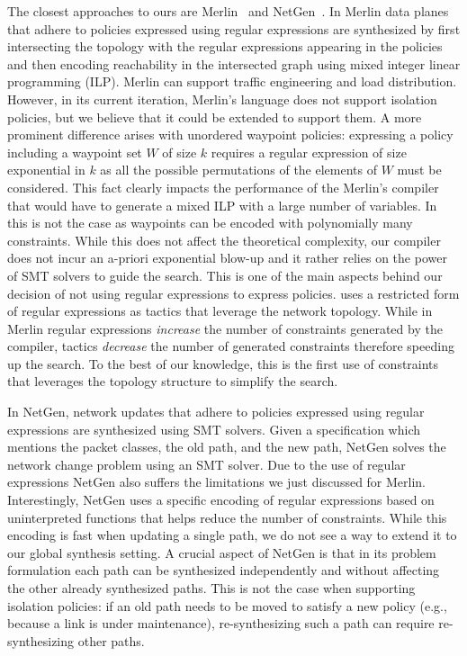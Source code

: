 The closest approaches to ours are Merlin~\cite{merlin} and
NetGen~\cite{netgen}.  In Merlin data planes that adhere to policies
expressed using regular expressions are synthesized by first
intersecting the topology with the regular expressions appearing in
the policies and then encoding reachability in the intersected graph
using mixed integer linear programming (ILP).
Merlin can support traffic engineering and load distribution. 
However, in its current iteration, 
Merlin's language does not support isolation policies, but we believe
that it could be extended to support them.  
A more prominent
difference arises with unordered waypoint policies: expressing a
policy including a waypoint set $W$ of size $k$ requires a regular
expression of size exponential in $k$ as all the possible permutations
of the elements of $W$ must be considered. This fact clearly impacts the performance of
the Merlin's compiler that would have to generate a mixed ILP with a
large number of variables.  In \Name this is not the case as waypoints
can be encoded with polynomially many constraints.  While this does
not affect the theoretical complexity, our compiler does not incur
an a-priori exponential blow-up and it rather relies on the power
of SMT solvers to guide the search.  This is one of the main aspects
behind our decision of not using regular expressions to express
policies.  \Name uses a restricted form of regular expressions as 
tactics that leverage the network topology.  While in Merlin
regular expressions \emph{increase} the number of constraints
generated by the compiler, tactics \emph{decrease}
the number of generated constraints therefore speeding up the search.
To the best of our knowledge, this is the first use of constraints
that leverages the topology structure to simplify the search.

In NetGen, network updates that adhere to policies expressed using
regular expressions are synthesized using SMT solvers.  Given a
specification which mentions the packet classes, the old path, and the
new path, NetGen solves the network change problem using an SMT solver.
Due to the use of regular expressions NetGen also suffers the
limitations we just discussed for Merlin.  Interestingly, NetGen uses
a specific encoding of regular expressions based on uninterpreted
functions that helps reduce the number of constraints. While this
encoding is fast when updating a single path, we do not see a way to
extend it to our global synthesis setting.  A crucial aspect of NetGen
is that in its problem formulation each path can be synthesized
independently and without affecting the other already synthesized
paths.  This is not the case when supporting isolation policies: if an
old path needs to be moved to satisfy a new policy (e.g., because a
link is under maintenance), re-synthesizing such a path can require
re-synthesizing other paths. 


